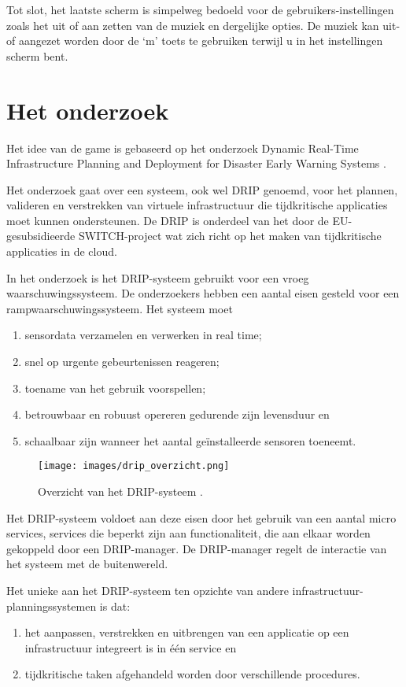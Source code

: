 \documentclass{article}
\begin{document}
Tot slot, het laatste scherm is simpelweg bedoeld voor de gebruikers-instellingen zoals het uit of aan zetten van de muziek en dergelijke opties. De muziek kan uit- of aangezet worden door de `m' toets te gebruiken terwijl u in het instellingen scherm bent.

\section{Het onderzoek}

Het idee van de game is gebaseerd op het onderzoek Dynamic Real-Time Infrastructure Planning and Deployment for Disaster Early Warning Systems \citep{Zhou2018}.

Het onderzoek gaat over een systeem, ook wel DRIP genoemd, voor het plannen, valideren en verstrekken van virtuele infrastructuur die tijdkritische applicaties moet kunnen ondersteunen. De DRIP is onderdeel van het door de EU-gesubsidieerde SWITCH-project wat zich richt op het maken van tijdkritische applicaties in de cloud.

In het onderzoek is het DRIP-systeem gebruikt voor een vroeg waarschuwingssysteem. De onderzoekers hebben een aantal eisen gesteld voor een rampwaarschuwingssysteem.
Het systeem moet
\begin{enumerate}
    \item sensordata verzamelen en verwerken in real time;
    \item snel op urgente gebeurtenissen reageren;
    \item toename van het gebruik voorspellen;
    \item betrouwbaar en robuust opereren gedurende zijn levensduur en
    \item schaalbaar zijn wanneer het aantal geïnstalleerde sensoren toeneemt. 
\end{enumerate}

\begin{figure}[H]
\centering
\texttt{[image: images/drip\_overzicht.png]}
\label{fig:start}
\caption{Overzicht van het DRIP-systeem \citep{Zhou2018}.}
\end{figure}

Het DRIP-systeem voldoet aan deze eisen door het gebruik van een aantal micro services, services die beperkt zijn aan functionaliteit, die aan elkaar worden gekoppeld door een DRIP-manager. De DRIP-manager regelt de interactie van het systeem met de buitenwereld.

Het unieke aan het DRIP-systeem ten opzichte van andere infrastructuur-planningssystemen is dat:
\begin{enumerate}
    \item het aanpassen, verstrekken en uitbrengen van een applicatie op een infrastructuur integreert is in één service en
    \item tijdkritische taken afgehandeld worden door verschillende procedures.
\end{enumerate}
\end{document}
